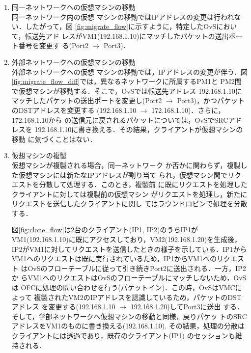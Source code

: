 \documentclass[a4paper, twocolumn]{jarticle}
\begin{document}
\begin{enumerate}
 \item 同一ネットワークへの仮想マシンの移動\\同一ネットワーク内の仮想
   マシンの移動ではIPアドレスの変更は行われない．したがって，図
   \ref{fig:migrate_flow}に示すように，特定したOvSにおいて，転送先アド
   レスがVM1(192.168.1.10)にマッチしたパケットの送出ポート番号を変更す
   る(Port2 $\rightarrow$ Port3)．

 \item 外部ネットワークへの仮想マシンの移動\\外部ネットワークへの仮想
   マシンの移動では，IPアドレスの変更が伴う．図
   \ref{fig:migrate_flow_diff}では，異なるネットワークに所属するPM1と
   PM2間で仮想マシンが移動する．そこで，OvSでは転送先アドレス
   192.168.1.10にマッチしたパケットの送出ポートを変更し(Port2
   $\rightarrow$ Port3)，かつパケットのDSTアドレスを変更する
   (192.168.1.10 $\rightarrow$ 172.168.1.10)．さらに，172.168.1.10から
   の送信元に戻されるパケットについては，OvSでSRCアドレスを
   192.168.1.10に書き換える．その結果，クライアントが仮想マシンの移動
   に気づくことはない．

 \item 仮想マシンの複製\\仮想マシンが複製される場合，同一ネットワーク
   か否かに関わらず，複製した仮想マシンには新たなIPアドレスが割り当て
   られ，仮想マシン間でリクエストを分散して処理する．このとき，複製前
   に既にリクエストを処理したクライアントに対しては複製前の仮想マシン
   がリクエストを処理し，新たにリクエストを送信したクライアントに関し
   てはラウンドロビンで処理を分散する．

   図\ref{fig:clone_flow}は2台のクライアント(IP1, IP2)のうちIP1が
   VM1(192.168.1.10)に既にアクセスしており，VM2(192.168.1.20)を生成後，
   IP2がVM1に対してリクエストを送信したときの様子を示している．IP1から
   VM1へのリクエストは既に実行されているため，IP1からVM1へのリクエスト
   はOvSのフローテーブルに従って引き続きPort2に送出される．一方，IP2か
   らVM1へのリクエストはOvSのフローテーブルにマッチしないため，OvSは
   OFCに処理の問い合わせを行う(パケットイン)．この時，OvSはVMCによって
   複製されたVM2のIPアドレスを認識しているため，パケットのDSTアドレス
   を変更する(192.168.1.10 $\rightarrow$ 192.168.1.20)してPort3に送出
   する．そして，学部ネットワークへ仮想マシンの移動と同様，戻りパケッ
   トのSRCアドレスをVM1のものに書き換える(192.168.1.10).
   その結果，処理の分散はクライアントには透過であり，既存のクライアント(IP1)
   のセッションも維持される．

\end{enumerate}
\end{document}
